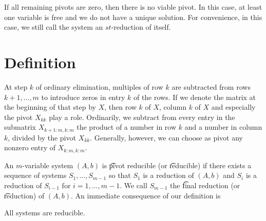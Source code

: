 If all remaining pivots are zero, then there is no viable pivot.
In this case, at least one variable is free and we do not have a unique solution.
For convenience, in this case, we still call the system an $st$-reduction of itself.


\section*{Definition}

At step $k$ of ordinary elimination, multiples of row $k$ are subtracted from rows $k+1, \dots , m$ to introduce zeros in entry $k$ of the rows.
If we denote the matrix at the beginning of that step by $X$, then row $k$ of $X$, column $k$ of $X$ and especially the pivot $X_{kk}$ play a role.
Ordinarily, we subtract from every entry in the submatrix $X_{k+1:m,k:m}$ the product of a number in row $k$ and a number in column $k$, divided by the pivot $X_{kk}$.
Generally, however, we can choose as pivot any nonzero entry of $X_{k:m,k:m}$.

An $m$-variable system $(A, b)$ is \t{pivot reducible} (or \t{reducible}) if there exists a sequence of systems $S_1, \dots , S_{m-1}$ so that $S_1$ is a reduction of $(A, b)$ and $S_{i}$ is a reduction of $S_{i-1}$ for $i = 1, \dots , m-1$.
We call $S_{m-1}$ the \t{final reduction} (or \t{reduction}) of $(A, b)$.
An immediate consequence of our definition is

\begin{proposition}
All systems are reducible.
\end{proposition}

